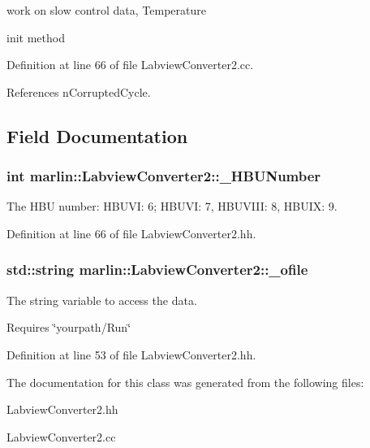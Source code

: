 work on slow control data, Temperature 

init method 

Definition at line 66 of file Labview\-Converter2.\-cc.



References n\-Corrupted\-Cycle.



\subsection{Field Documentation}
\subsubsection[{\-\_\-\-H\-B\-U\-Number}]{\setlength{\rightskip}{0pt plus 5cm}int marlin\-::\-Labview\-Converter2\-::\-\_\-\-H\-B\-U\-Number\hspace{0.3cm}{\ttfamily [protected]}}\label{classmarlin_1_1LabviewConverter2_a8dc9c62b6c335f9af82b17b00b7c6c1b}


The H\-B\-U number\-: H\-B\-U\-V\-I\-: 6; H\-B\-U\-V\-I\-: 7, H\-B\-U\-V\-I\-I\-I\-: 8, H\-B\-U\-I\-X\-: 9. 



Definition at line 66 of file Labview\-Converter2.\-hh.

\subsubsection[{\-\_\-ofile}]{\setlength{\rightskip}{0pt plus 5cm}std\-::string marlin\-::\-Labview\-Converter2\-::\-\_\-ofile\hspace{0.3cm}{\ttfamily [protected]}}\label{classmarlin_1_1LabviewConverter2_a71f598537b02b4a46c1c2622dbac8d9e}


The string variable to access the data. 

Requires \char`\"{}yourpath/\-Run\char`\"{} 

Definition at line 53 of file Labview\-Converter2.\-hh.



The documentation for this class was generated from the following files\-:\begin{DoxyCompactItemize}
\item 
Labview\-Converter2.\-hh\item 
Labview\-Converter2.\-cc\end{DoxyCompactItemize}
